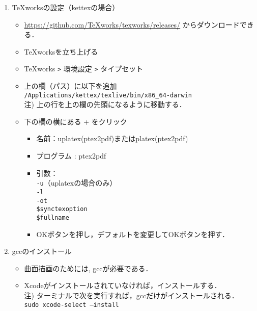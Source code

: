 \documentclass{ujarticle}
\begin{document}
\begin{enumerate}[\bf\large 1.]
\item TeXworksの設定（kettexの場合）
  \begin{itemize}
  \item \url{https://github.com/TeXworks/texworks/releases/} からダウンロードできる．
  \item TeXworksを立ち上げる
  \item TeXworks \verb|>| 環境設定 \verb|>| タイプセット
  \item 上の欄（パス）に以下を追加\\
  \hspace*{5mm}\verb|/Applications/kettex/texlive/bin/x86_64-darwin|\\
  \hspace*{10mm}注) 上の行を上の欄の先頭になるように移動する．
  \item 下の欄の横にある + をクリック
    \begin{itemize}
    \item 名前：uplatex(ptex2pdf)またはplatex(ptex2pdf)
    \item プログラム : ptex2pdf
    \item 引数：\\
    \hspace*{10mm} \verb|-u|（uplatexの場合のみ）\\
    \hspace*{10mm} \verb|-l|\\
    \hspace*{10mm} \verb|-ot|\\
    \hspace*{10mm}  \verb|$synctexoption|\\
    \hspace*{10mm}  \verb|$fullname|
    \item[]OKボタンを押し，デフォルトを変更してOKボタンを押す．
    \end{itemize}
  \end{itemize}
\item gccのインストール
  \begin{itemize}
    \item 曲面描画のためには, gccが必要である．
    \item Xcodeがインストールされていなければ，インストールする．\\
    \hspace*{5mm}注) ターミナルで次を実行すれば，gccだけがインストールされる．\\
    \hspace*{20mm}\verb|sudo xcode-select —install|
  \end{itemize}


\end{enumerate}
\end{document}
